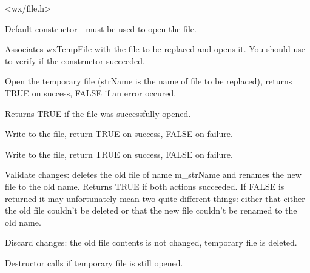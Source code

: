 
<wx/file.h>




\label{wxtempfilewxtempfilector}

Default constructor -  must be used to open the
file.

\label{wxtempfilewxtempfile}

Associates wxTempFile with the file to be replaced and opens it. You should use
 to verify if the constructor succeeded.

\label{wxtempfileopen}

Open the temporary file (strName is the name of file to be replaced), returns
TRUE on success, FALSE if an error occured.

\label{wxtempfileisopened}

Returns TRUE if the file was successfully opened.

\label{wxtempfilewrite}

Write to the file, return TRUE on success, FALSE on failure.

\label{wxtempfilewrites}

Write to the file, return TRUE on success, FALSE on failure.

\label{wxtempfilecommit}

Validate changes: deletes the old file of name m\_strName and renames the new
file to the old name. Returns TRUE if both actions succeeded. If FALSE is
returned it may unfortunately mean two quite different things: either that
either the old file couldn't be deleted or that the new file couldn't be renamed
to the old name.

\label{wxtempfilediscard}

Discard changes: the old file contents is not changed, temporary file is
deleted.

\label{wxtempfiledtor}

Destructor calls  if temporary file
is still opened.

